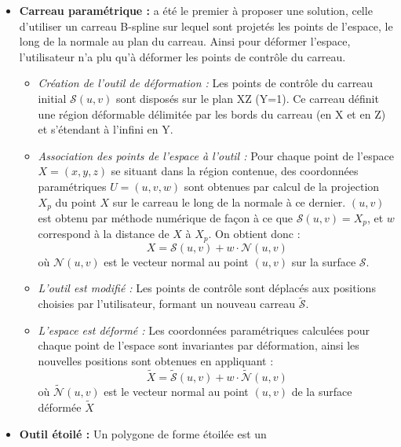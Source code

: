 \begin{itemize}
\item{\textbf{Carreau paramétrique :}} \cite{JLQ96} a été le premier à
  proposer une solution, celle d'utiliser un carreau B-spline sur
  lequel sont projetés les points de l'espace, le long de la normale
  au plan du carreau. Ainsi pour déformer l'espace, l'utilisateur n'a
  plu qu'à déformer les points de contrôle du carreau.
  \begin{itemize}
  \item{\textit{Création de l'outil de déformation :}} Les points de
    contrôle du carreau initial \( \mathcal{S}(u,v) \) sont disposés
    sur le plan XZ (Y=1). Ce carreau définit une région déformable
    délimitée par les bords du carreau (en X et en Z) et s'étendant à
    l'infini en Y.
  \item{\textit{Association des points de l'espace à l'outil :}} Pour
    chaque point de l'espace \( X = (x,y,z) \) se situant dans la
    région contenue, des coordonnées paramétriques \( U = (u,v,w) \)
    sont obtenues par calcul de la projection \( X_p \) du point \( X
    \) sur le carreau le long de la normale à ce dernier. \( (u,v) \)
    est obtenu par méthode numérique de façon à ce que \(
    \mathcal{S}(u,v) = X_p \), et \( w \) correspond à la distance de
    \( X \) à \( X_p \). On obtient donc :
    \begin{equation}
      X = \mathcal{S}(u,v) + w \cdot \mathcal{N}(u,v)
    \end{equation}
    où \( \mathcal{N}(u,v) \) est le vecteur normal au point \( (u,v)
    \) sur la surface \( \mathcal{S} \).
  \item{\textit{L'outil est modifié :}} Les points de contrôle sont
    déplacés aux positions choisies par l'utilisateur, formant un
    nouveau carreau \( \tilde{\mathcal{S}} \).
  \item{\textit{L'espace est déformé :}} Les coordonnées paramétriques
    calculées pour chaque point de l'espace sont invariantes par
    déformation, ainsi les nouvelles positions sont obtenues en
    appliquant :
    \begin{equation}
      \tilde{X} = \tilde{\mathcal{S}}(u,v) + w \cdot \tilde{\mathcal{N}}(u,v)
    \end{equation}
    où \( \tilde{\mathcal{N}}(u,v) \) est le vecteur normal au point
    \( (u,v) \) de la surface déformée \( \tilde{X} \)
  \end{itemize}
\item{\textbf{Outil étoilé :}} Un polygone de forme étoilée est un

\end{itemize}
